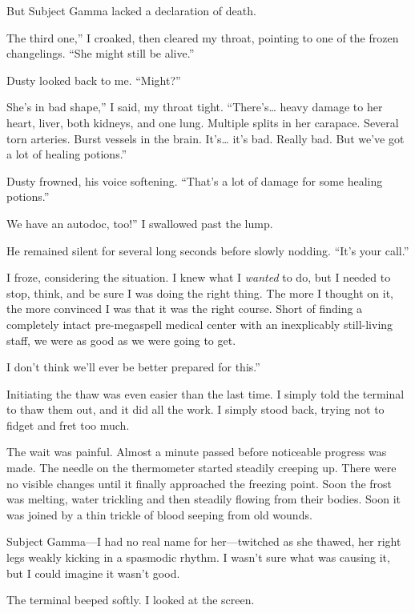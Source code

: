 But Subject Gamma lacked a declaration of death.

\leavevmode{}The third one,” I croaked, then cleared my throat, pointing to one of the frozen changelings. “She might still be alive.”

Dusty looked back to me. “Might?”

\leavevmode{}She’s in bad shape,” I said, my throat tight. “There’s… heavy damage to her heart, liver, both kidneys, and one lung. Multiple splits in her carapace. Several torn arteries. Burst vessels in the brain. It’s… it’s bad. Really bad. But we’ve got a lot of healing potions.”

Dusty frowned, his voice softening. “That’s a lot of damage for some healing potions.”

\leavevmode{}We have an autodoc, too!” I swallowed past the lump.

He remained silent for several long seconds before slowly nodding. “It’s your call.”

I froze, considering the situation. I knew what I \textit{wanted} to do, but I needed to stop, think, and be sure I was doing the right thing. The more I thought on it, the more convinced I was that it was the right course. Short of finding a completely intact pre-megaspell medical center with an inexplicably still-living staff, we were as good as we were going to get.

\leavevmode{}I don’t think we’ll ever be better prepared for this.”

Initiating the thaw was even easier than the last time. I simply told the terminal to thaw them out, and it did all the work. I simply stood back, trying not to fidget and fret too much.

The wait was painful. Almost a minute passed before noticeable progress was made. The needle on the thermometer started steadily creeping up. There were no visible changes until it finally approached the freezing point. Soon the frost was melting, water trickling and then steadily flowing from their bodies. Soon it was joined by a thin trickle of blood seeping from old wounds.

Subject Gamma—I had no real name for her—twitched as she thawed, her right legs weakly kicking in a spasmodic rhythm. I wasn’t sure what was causing it, but I could imagine it wasn’t good.

The terminal beeped softly. I looked at the screen.


